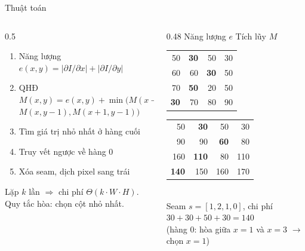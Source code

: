 \documentclass[aspectratio=169,11pt]{beamer}
\begin{document}
\begin{frame}{Thuật toán}
  \begin{columns}[T]
    \begin{column}{0.5\textwidth}
      \small
      \begin{enumerate}
        \item Năng lượng\quad $e(x,y)=|\partial I/\partial x|+|\partial I/\partial y|$
        \item QHĐ\quad $M(x,y)=e(x,y)+\min\bigl(M(x{-}1,y{-}1),$\\
              \hspace*{5.2em}$M(x,y{-}1),M(x{+}1,y{-}1)\bigr)$
        \item Tìm giá trị nhỏ nhất ở hàng cuối
        \item Truy vết ngược về hàng 0
        \item Xóa seam, dịch pixel sang trái
      \end{enumerate}
      \vspace{6pt}
      Lặp $k$ lần $\Rightarrow$ chi phí $\Theta(k\cdot W\cdot H)$.\\[4pt]
      \small Quy tắc hòa: chọn cột nhỏ nhất.
    \end{column}
    \begin{column}{0.48\textwidth}
      \centering\footnotesize\setlength{\tabcolsep}{4pt}
      Năng lượng $e$ \hspace{5.5em} Tích lũy $M$\\[2pt]
      \begin{tabular}{rrrr}\toprule 50&\textbf{\color{warn}30}&50&30\\ 60&60&\textbf{\color{warn}30}&50\\
        70&\textbf{\color{warn}50}&20&50\\ \textbf{\color{warn}30}&70&80&90\\\bottomrule\end{tabular}\quad
      \begin{tabular}{rrrr}\toprule 50&\textbf{\color{warn}30}&50&30\\ 90&90&\textbf{\color{warn}60}&80\\
        160&\textbf{\color{warn}110}&80&110\\ \textbf{\color{warn}140}&150&160&170\\\bottomrule\end{tabular}\\[6pt]
      \footnotesize Seam $s=[1,2,1,0]$, chi phí $30+30+50+30=140$\\
      (hàng 0: hòa giữa $x=1$ và $x=3$ $\to$ chọn $x=1$)
    \end{column}
  \end{columns}
\end{frame}
\end{document}
